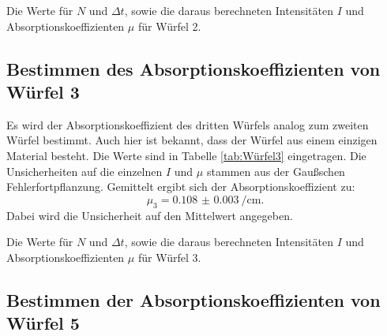 \begin{table}
	\centering
	\caption{Die Werte für $N$ und $\Delta t$, sowie die daraus berechneten Intensitäten $I$ und Absorptionskoeffizienten $\mu$ für Würfel 2.}
	
	\label{tab:Würfel2}
\end{table}

\subsection{Bestimmen des Absorptionskoeffizienten von Würfel 3}

Es wird der Absorptionskoeffizient des dritten Würfels analog zum zweiten Würfel bestimmt. Auch hier ist bekannt, dass der Würfel aus einem einzigen Material besteht. Die Werte sind in Tabelle \ref{tab:Würfel3} eingetragen. Die Unsicherheiten auf die einzelnen $I$ und $\mu$ stammen aus der Gaußschen Fehlerfortpflanzung.
Gemittelt ergibt sich der Absorptionskoeffizient zu:
\[
\mu_3 = \SI{0.108(3)}{\per\centi\metre}\text{.}
\]
Dabei wird die Unsicherheit auf den Mittelwert angegeben.

\begin{table}
	\centering
	\caption{Die Werte für $N$ und $\Delta t$, sowie die daraus berechneten Intensitäten $I$ und Absorptionskoeffizienten $\mu$ für Würfel 3.}
	
	\label{tab:Würfel3}
\end{table}

\subsection{Bestimmen der Absorptionskoeffizienten von Würfel 5}

